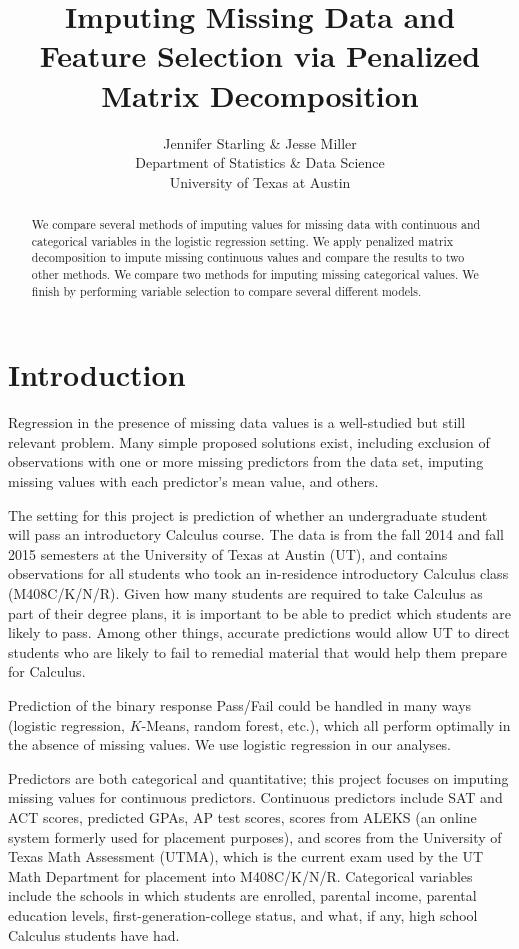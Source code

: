 \documentclass{article}
\title{Imputing Missing Data and Feature Selection via Penalized Matrix Decomposition}
\author{
  Jennifer Starling \& Jesse Miller\\%
  Department of Statistics \& Data Science\\
  University of Texas at Austin\\
}
\begin{document}

\maketitle

\begin{abstract}
We compare several methods of imputing values for missing data with continuous and categorical variables in the logistic regression setting.  We apply penalized matrix decomposition to impute missing continuous values and compare the results to two other methods.  We compare two methods for imputing missing categorical values.  We finish by performing variable selection to compare several different models.
\end{abstract}

\section{Introduction}

Regression in the presence of missing data values is a well-studied but still relevant problem.  Many simple proposed solutions exist, including exclusion of observations with one or more missing predictors from the data set, imputing missing values with each predictor's mean value, and others.

The setting for this project is prediction of whether an undergraduate student will pass an introductory Calculus course.  The data is from the fall 2014 and fall 2015 semesters at the University of Texas at Austin (UT), and contains observations for all students who took an in-residence introductory Calculus class (M408C/K/N/R).  Given how many students are required to take Calculus as part of their degree plans, it is important to be able to predict which students are likely to pass.  Among other things, accurate predictions would allow UT to direct students who are likely to fail to remedial material that would help them prepare for Calculus.

Prediction of the binary response Pass/Fail could be handled in many ways (logistic regression, $K$-Means, random forest, etc.), which all perform optimally in the absence of missing values.  We use logistic regression in our analyses.

Predictors are both categorical and quantitative; this project focuses on imputing missing values for continuous predictors.  Continuous predictors include SAT and ACT scores, predicted GPAs, AP test scores, scores from ALEKS (an online system formerly used for placement purposes), and scores from the University of Texas Math Assessment (UTMA), which is the current exam used by the UT Math Department for placement into M408C/K/N/R.  Categorical variables include the schools in which students are enrolled, parental income, parental education levels, first-generation-college status, and what, if any, high school Calculus students have had.
\end{document}
